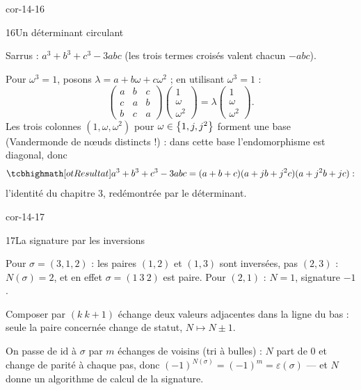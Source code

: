 \begin{blocLivre}{cor-14-16}
\begin{corrige}{16}{Un déterminant circulant}
\begin{questions}
  \item Sarrus :
    $a^{3}+b^{3}+c^{3}-3abc$ (les trois termes croisés valent chacun
    $-abc$).
  \item Pour $\omega^{3}=1$, posons $\lambda=a+b\omega+c\omega^{2}$ ; en
    utilisant $\omega^{3}=1$ :
    \[
    \begin{pmatrix}a&b&c\\c&a&b\\b&c&a\end{pmatrix}
    \begin{pmatrix}1\\\omega\\\omega^{2}\end{pmatrix}
    =\lambda\begin{pmatrix}1\\\omega\\\omega^{2}\end{pmatrix}.
    \]
    Les trois colonnes $(1,\omega,\omega^{2})$ pour
    $\omega\in\left\{1,j,j^{2}\right\}$ forment une base (Vandermonde de nœuds
    distincts !) : dans cette base l'endomorphisme est diagonal, donc
    \[
    \res{a^{3}+b^{3}+c^{3}-3abc=(a+b+c)(a+jb+j^{2}c)(a+j^{2}b+jc)} :
    \]
    l'identité du chapitre 3, redémontrée par le déterminant.
\end{questions}
\end{corrige}
\end{blocLivre}

\begin{blocLivre}{cor-14-17}
\begin{corrige}{17}{La signature par les inversions}
\begin{questions}
  \item Pour $\sigma=(3,1,2)$ : les paires $(1,2)$ et $(1,3)$ sont
    inversées, pas $(2,3)$ : $N(\sigma)=2$, et en effet
    $\sigma=(1\ 3\ 2)$ est paire. Pour $(2,1)$ : $N=1$, signature $-1$.
  \item Composer par $(k\ k{+}1)$ échange deux valeurs adjacentes dans la
    ligne du bas : seule la paire concernée change de statut,
    $N\mapsto N\pm1$.
  \item On passe de $\mathrm{id}$ à $\sigma$ par $m$ échanges de voisins
    (tri à bulles) : $N$ part de $0$ et change de parité à chaque pas,
    donc $(-1)^{N(\sigma)}=(-1)^{m}=\varepsilon(\sigma)$ — et $N$ donne un
    algorithme de calcul de la signature.
\end{questions}
\end{corrige}
\end{blocLivre}

